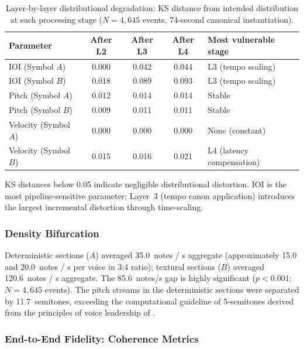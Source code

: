 \documentclass[a4paper]{article}
\newcommand{\tbl}[2]{\caption{#1}\centering#2}
\newcommand{\tabnote}[1]{\par\vspace{0.5ex}\footnotesize#1}
\theoremstyle{definition}
\theoremstyle{remark}
\begin{document}
\begin{table}[htbp]
\tbl{Layer-by-layer distributional degradation: KS distance from intended distribution at each processing stage ($N = 4{,}645$ events, 74-second canonical instantiation).}
{\begin{tabular}{@{}lcccl@{}} \toprule
\textbf{Parameter} & \textbf{After L2} & \textbf{After L3} & \textbf{After L4} & \textbf{Most vulnerable stage} \\ \midrule
IOI (Symbol $A$) & 0.000 & 0.042 & 0.044 & L3 (tempo scaling) \\
IOI (Symbol $B$) & 0.018 & 0.089 & 0.093 & L3 (tempo scaling) \\
Pitch (Symbol $A$) & 0.012 & 0.014 & 0.014 & Stable \\
Pitch (Symbol $B$) & 0.009 & 0.011 & 0.011 & Stable \\
Velocity (Symbol $A$) & 0.000 & 0.000 & 0.000 & None (constant) \\
Velocity (Symbol $B$) & 0.015 & 0.016 & 0.021 & L4 (latency compensation) \\ \bottomrule
\end{tabular}}
\tabnote{KS distances below 0.05 indicate negligible distributional distortion. IOI is the most pipeline-sensitive parameter; Layer~3 (tempo canon application) introduces the largest incremental distortion through time-scaling.}
\label{tab:degradation}
\end{table}

\subsubsection{Density Bifurcation}

Deterministic sections ($A$) averaged 35.0~notes / s aggregate (approximately 15.0 and 20.0~notes / s per voice in 3:4 ratio); textural sections ($B$) averaged 120.6~notes / s aggregate. The 85.6~notes/s gap is highly significant ($p < 0.001$; $N = 4{,}645$ events). The pitch streams in the deterministic sections were separated by 11.7~semitones, exceeding the computational guideline of 5-semitones derived from the principles of voice leadership of \citet{huron2001tone}.

\subsubsection{End-to-End Fidelity: Coherence Metrics}
\end{document}
